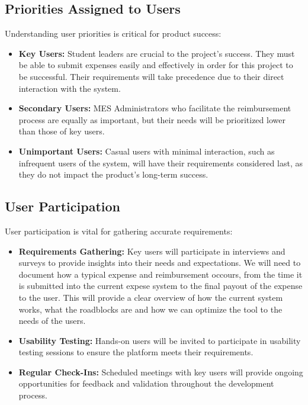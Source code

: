 \documentclass[12pt]{article}
\begin{document}
\subsection{Priorities Assigned to Users}
Understanding user priorities is critical for product success:
\begin{itemize}
    \item \textbf{Key Users:} Student leaders are crucial to the project's success. They must be able to submit expenses easily and effectively in order for this project to be successful. Their requirements will take precedence due to their direct interaction with the system.
    \item \textbf{Secondary Users:} MES Administrators who facilitate the reimbursement process are equally as important, but their needs will be prioritized lower than those of key users.
    \item \textbf{Unimportant Users:} Casual users with minimal interaction, such as infrequent users of the system, will have their requirements considered last, as they do not impact the product's long-term success.
\end{itemize}

\subsection{User Participation}
User participation is vital for gathering accurate requirements:
\begin{itemize}
    \item \textbf{Requirements Gathering:} Key users will participate in interviews and surveys to provide insights into their needs and expectations. We will need to document how a typical expense and reimbursement occours, from the time it is submitted into the current expese system to the final payout of the expense to the user. This will provide a clear overview of how the current system works, what the roadblocks are and how we can optimize the tool to the needs of the users.
    \item \textbf{Usability Testing:} Hands-on users will be invited to participate in usability testing sessions to ensure the platform meets their requirements.
    \item \textbf{Regular Check-Ins:} Scheduled meetings with key users will provide ongoing opportunities for feedback and validation throughout the development process.
\end{itemize}
\end{document}
